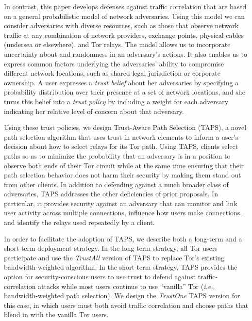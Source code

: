 \documentclass[conference]{styles/IEEEtran}
\newcommand{\ie}{\emph{i.e.}}
\newcommand{\ps}{TAPS\xspace}
\begin{document}
In contrast, this paper develops defenses against traffic correlation that are based on a
general probabilistic model of network adversaries. Using this model we can
consider adversaries with diverse resources, such as those that observe network traffic
at any combination of
network providers, exchange points, physical cables (undersea or elsewhere), and
Tor relays. The model allows us to incorporate uncertainty about and randomness in an
adversary's actions. It also enables us to express common factors underlying
the adversaries' ability to compromise different network locations, such as shared legal
jurisdiction or corporate ownership. A user expresses a \emph{trust belief} about her
adversaries by specifying a probability distribution over their presence at a set of network
locations, and she turns this belief into a \emph{trust policy} by including a weight for each adversary indicating her relative level of concern about that adversary.

Using these trust policies, we design Trust-Aware Path Selection (TAPS), a novel
path-selection algorithm that uses trust in network elements to inform a
user's decision about how to select relays for its Tor path. Using \ps, clients
select paths so as to minimize the probability that an adversary is in a
position to observe both ends of their Tor circuit while at the same time
ensuring that their path selection behavior does not harm their security by
making them stand out from other clients. In addition to defending against a much
broader class of adversaries, \ps addresses the other deficiencies of prior proposals.
In particular, it provides security against an adversary that can monitor and link user
activity across multiple connections, influence how users make connections, and
identify the relays used repeatedly by a client.

In order to facilitate the adoption of \ps, we describe both a long-term and a short-term
deployment strategy. In the long-term strategy, all Tor users participate and use
the \emph{TrustAll} version of \ps to replace Tor's existing bandwidth-weighted algorithm.
In the short-term strategy, \ps provides the option for security-conscious users to use trust to
defend against traffic-correlation attacks while most users continue to use ``vanilla''
Tor (\ie{}, bandwidth-weighted path selection). We design the \emph{TrustOne} \ps version for
this case, in which users must both avoid traffic correlation and choose paths that blend in
with the vanilla Tor users.
\end{document}
